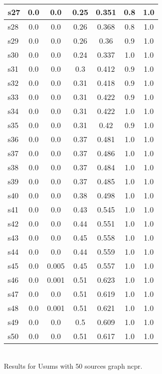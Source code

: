 \documentclass{article}
\begin{document}
\begin{tabular}{|l|c|c|c|c|c|c|}
s27 &0.0 & 0.0 & 0.25 & 0.351 & 0.8 & 1.0\\
\hline
s28 &0.0 & 0.0 & 0.26 & 0.368 & 0.8 & 1.0\\
\hline
s29 &0.0 & 0.0 & 0.26 & 0.36 & 0.9 & 1.0\\
\hline
s30 &0.0 & 0.0 & 0.24 & 0.337 & 1.0 & 1.0\\
\hline
s31 &0.0 & 0.0 & 0.3 & 0.412 & 0.9 & 1.0\\
\hline
s32 &0.0 & 0.0 & 0.31 & 0.418 & 0.9 & 1.0\\
\hline
s33 &0.0 & 0.0 & 0.31 & 0.422 & 0.9 & 1.0\\
\hline
s34 &0.0 & 0.0 & 0.31 & 0.422 & 1.0 & 1.0\\
\hline
s35 &0.0 & 0.0 & 0.31 & 0.42 & 0.9 & 1.0\\
\hline
s36 &0.0 & 0.0 & 0.37 & 0.481 & 1.0 & 1.0\\
\hline
s37 &0.0 & 0.0 & 0.37 & 0.486 & 1.0 & 1.0\\
\hline
s38 &0.0 & 0.0 & 0.37 & 0.484 & 1.0 & 1.0\\
\hline
s39 &0.0 & 0.0 & 0.37 & 0.485 & 1.0 & 1.0\\
\hline
s40 &0.0 & 0.0 & 0.38 & 0.498 & 1.0 & 1.0\\
\hline
s41 &0.0 & 0.0 & 0.43 & 0.545 & 1.0 & 1.0\\
\hline
s42 &0.0 & 0.0 & 0.44 & 0.551 & 1.0 & 1.0\\
\hline
s43 &0.0 & 0.0 & 0.45 & 0.558 & 1.0 & 1.0\\
\hline
s44 &0.0 & 0.0 & 0.44 & 0.559 & 1.0 & 1.0\\
\hline
s45 &0.0 & 0.005 & 0.45 & 0.557 & 1.0 & 1.0\\
\hline
s46 &0.0 & 0.001 & 0.51 & 0.623 & 1.0 & 1.0\\
\hline
s47 &0.0 & 0.0 & 0.51 & 0.619 & 1.0 & 1.0\\
\hline
s48 &0.0 & 0.001 & 0.51 & 0.621 & 1.0 & 1.0\\
\hline
s49 &0.0 & 0.0 & 0.5 & 0.609 & 1.0 & 1.0\\
\hline
s50 &0.0 & 0.0 & 0.51 & 0.617 & 1.0 & 1.0\\
\hline
\end{tabular}\\

\noindent Results for Usums with 50 sources graph ncpr.
\end{document}
